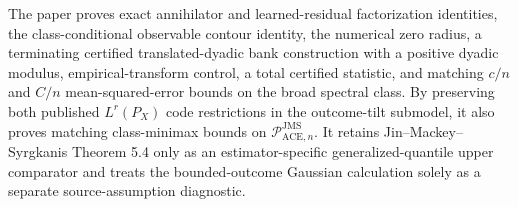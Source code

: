 The paper proves exact annihilator and learned-residual factorization identities, the class-conditional observable contour identity, the numerical zero radius, a terminating certified translated-dyadic bank construction with a positive dyadic modulus, empirical-transform control, a total certified statistic, and matching \(c/n\) and \(C/n\) mean-squared-error bounds on the broad spectral class.  By preserving both published \(L^r(P_X)\) code restrictions in the outcome-tilt submodel, it also proves matching class-minimax bounds on \(\mathcal P_{\mathrm{ACE},n}^{\mathrm{JMS}}\).  It retains Jin--Mackey--Syrgkanis Theorem 5.4 only as an estimator-specific generalized-quantile upper comparator and treats the bounded-outcome Gaussian calculation solely as a separate source-assumption diagnostic.